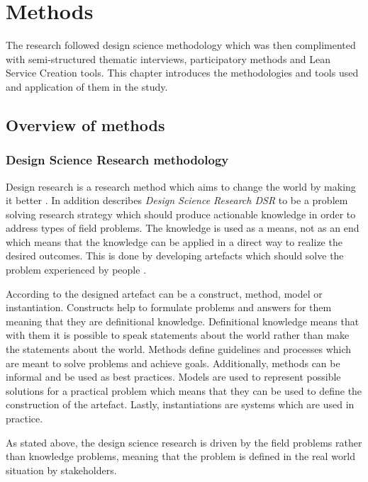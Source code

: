 \chapter{Methods}
\label{chapter:methods}

The research followed design science methodology which was then complimented with semi-structured thematic interviews, participatory methods and Lean Service Creation tools. This chapter introduces the methodologies and tools used and application of them in the study.

\section{Overview of methods}
\label{section:overview}

\subsection{Design Science Research methodology}

Design research is a research method which aims to change the world by making it better \parencite{Johannesson:2014}. In addition \textcite{Aken:2014} describes \emph{Design Science Research DSR} to be a problem solving research strategy which should produce actionable knowledge in order to address types of field problems. The knowledge is used as a means, not as an end which means that the knowledge can be applied in a direct way to realize the desired outcomes. This is done by developing artefacts which should solve the problem experienced by people \parencite{Johannesson:2014}.

According to \textcite{Johannesson:2014} the designed artefact can be a construct, method, model or instantiation. Constructs help to formulate problems and answers for them meaning that they are definitional knowledge. Definitional knowledge means that with them it is possible to speak statements about the world rather than make the statements about the world. Methods define guidelines and processes which are meant to solve problems and achieve goals. Additionally, methods can be informal and be used as best practices. Models are used to represent possible solutions for a practical problem which means that they can be used to define the construction of the artefact. Lastly, instantiations are systems which are used in practice.

As stated above, the design science research is driven by the field problems rather than knowledge problems, meaning that the problem is defined in the real world situation by stakeholders. 

